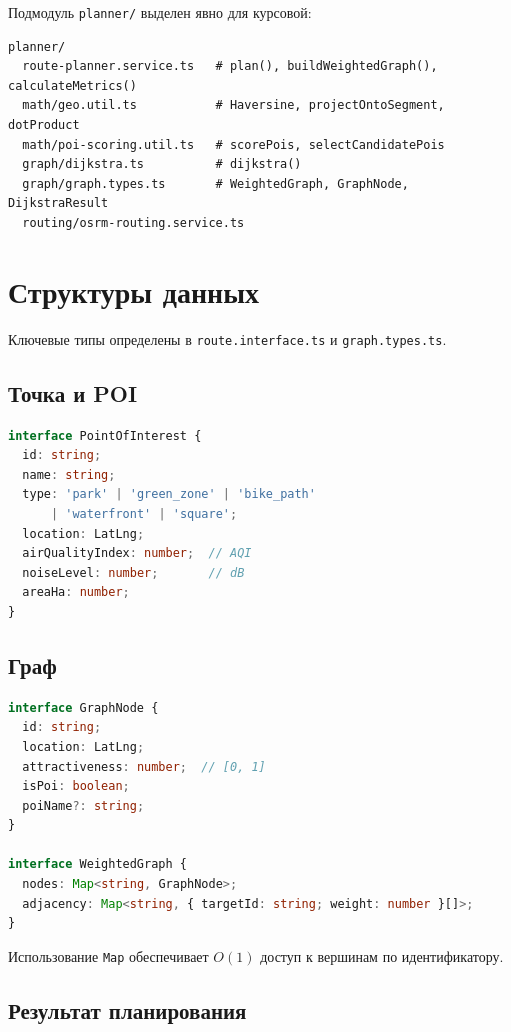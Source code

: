 Подмодуль \texttt{planner/} выделен явно для курсовой:
\begin{verbatim}
planner/
  route-planner.service.ts   # plan(), buildWeightedGraph(), calculateMetrics()
  math/geo.util.ts           # Haversine, projectOntoSegment, dotProduct
  math/poi-scoring.util.ts   # scorePois, selectCandidatePois
  graph/dijkstra.ts          # dijkstra()
  graph/graph.types.ts       # WeightedGraph, GraphNode, DijkstraResult
  routing/osrm-routing.service.ts
\end{verbatim}

\section{Структуры данных}

Ключевые типы определены в \texttt{route.interface.ts} и \texttt{graph.types.ts}.

\subsection{Точка и POI}

\begin{lstlisting}[language=TypeScript,caption={Фрагмент интерфейса PointOfInterest},label={lst:poi-interface}]
interface PointOfInterest {
  id: string;
  name: string;
  type: 'park' | 'green_zone' | 'bike_path'
      | 'waterfront' | 'square';
  location: LatLng;
  airQualityIndex: number;  // AQI
  noiseLevel: number;       // dB
  areaHa: number;
}
\end{lstlisting}

\subsection{Граф}

\begin{lstlisting}[language=TypeScript,caption={Типы взвешенного графа},label={lst:graph-types}]
interface GraphNode {
  id: string;
  location: LatLng;
  attractiveness: number;  // [0, 1]
  isPoi: boolean;
  poiName?: string;
}

interface WeightedGraph {
  nodes: Map<string, GraphNode>;
  adjacency: Map<string, { targetId: string; weight: number }[]>;
}
\end{lstlisting}

Использование \texttt{Map} обеспечивает $O(1)$ доступ к вершинам по идентификатору.

\subsection{Результат планирования}


